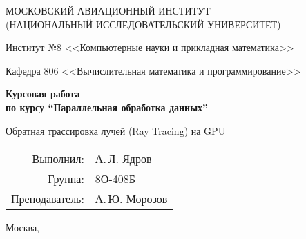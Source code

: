 \begin{titlepage}
    \begin{center}
    \large
    МОСКОВСКИЙ АВИАЦИОННЫЙ ИНСТИТУТ\\ (НАЦИОНАЛЬНЫЙ ИССЛЕДОВАТЕЛЬСКИЙ УНИВЕРСИТЕТ)
    
    \vspace{20pt}
    
    Институт №8 <<Компьютерные науки и прикладная математика>>
    
    Кафедра 806 <<Вычислительная математика и программирование>>
    \end{center}
    
    \vspace{60pt}
    
    \begin{center}
    \bfseries
    \large
    Курсовая работа \\по курсу \enquote{Параллельная обработка данных}
    
    \vspace{54pt}
    
    Обратная трассировка лучей (Ray Tracing) на GPU
    \end{center}
    
    \vfill
    
    \begin{flushright}
    \large
    \begin{tabular}{rl}
    Выполнил: & А.\,Л. Ядров \\
    Группа: & 8О-408Б \\
    Преподаватель: & А.\,Ю. Морозов \\
    \end{tabular}
    \end{flushright}
    
    \vspace{92pt}
    
    \begin{center}
    \large
    Москва, \the\year
    \end{center}
    \end{titlepage}
    
    \pagebreak